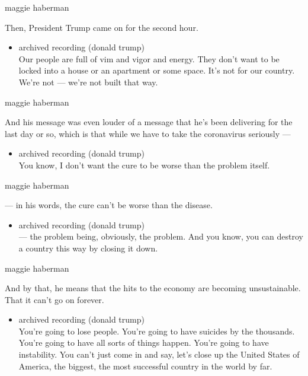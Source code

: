 maggie haberman

Then, President Trump came on for the second hour.

\begin{itemize}
\tightlist
\item
  archived recording (donald trump)\\
  Our people are full of vim and vigor and energy. They don't want to be
  locked into a house or an apartment or some space. It's not for our
  country. We're not --- we're not built that way.
\end{itemize}

maggie haberman

And his message was even louder of a message that he's been delivering
for the last day or so, which is that while we have to take the
coronavirus seriously ---

\begin{itemize}
\tightlist
\item
  archived recording (donald trump)\\
  You know, I don't want the cure to be worse than the problem itself.
\end{itemize}

maggie haberman

--- in his words, the cure can't be worse than the disease.

\begin{itemize}
\tightlist
\item
  archived recording (donald trump)\\
  --- the problem being, obviously, the problem. And you know, you can
  destroy a country this way by closing it down.
\end{itemize}

maggie haberman

And by that, he means that the hits to the economy are becoming
unsustainable. That it can't go on forever.

\begin{itemize}
\tightlist
\item
  archived recording (donald trump)\\
  You're going to lose people. You're going to have suicides by the
  thousands. You're going to have all sorts of things happen. You're
  going to have instability. You can't just come in and say, let's close
  up the United States of America, the biggest, the most successful
  country in the world by far.
\end{itemize}

